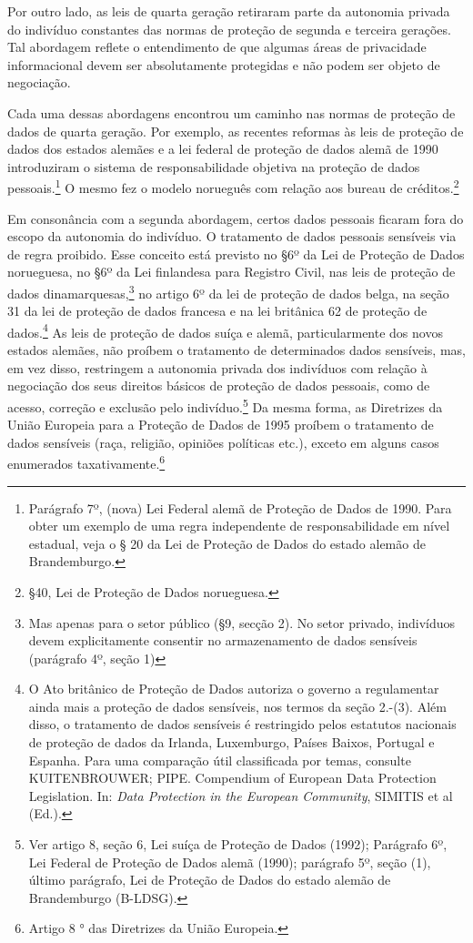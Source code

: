 Por outro lado, as leis de quarta geração retiraram parte da autonomia
privada do indivíduo constantes das normas de proteção de segunda e
terceira gerações. Tal abordagem reflete o entendimento de que algumas
áreas de privacidade informacional devem ser absolutamente protegidas e
não podem ser objeto de negociação.

Cada uma dessas abordagens encontrou um caminho nas normas de proteção
de dados de quarta geração. Por exemplo, as recentes reformas às leis de
proteção de dados dos estados alemães e a lei federal de proteção de
dados alemã de 1990 introduziram o sistema de responsabilidade objetiva
na proteção de dados pessoais.\footnote{Parágrafo 7º, (nova) Lei Federal
  alemã de Proteção de Dados de 1990. Para obter um exemplo de uma regra
  independente de responsabilidade em nível estadual, veja o § 20 da Lei
  de Proteção de Dados do estado alemão de Brandemburgo.} O mesmo fez o
modelo norueguês com relação aos bureau de créditos.\footnote{§40, Lei
  de Proteção de Dados norueguesa.}

Em consonância com a segunda abordagem, certos dados pessoais ficaram
fora do escopo da autonomia do indivíduo. O tratamento de dados pessoais
sensíveis via de regra proibido. Esse conceito está previsto no §6º da
Lei de Proteção de Dados norueguesa, no §6º da Lei finlandesa para
Registro Civil, nas leis de proteção de dados dinamarquesas,\footnote{Mas
  apenas para o setor público (§9, secção 2). No setor privado,
  indivíduos devem explicitamente consentir no armazenamento de dados
  sensíveis (parágrafo 4º, seção 1)} no artigo 6º da lei de proteção de
dados belga, na seção 31 da lei de proteção de dados francesa e na lei
britânica 62 de proteção de dados.\footnote{O Ato britânico de Proteção
  de Dados autoriza o governo a regulamentar ainda mais a proteção de
  dados sensíveis, nos termos da seção 2.-(3). Além disso, o tratamento
  de dados sensíveis é restringido pelos estatutos nacionais de proteção
  de dados da Irlanda, Luxemburgo, Países Baixos, Portugal e Espanha.
  Para uma comparação útil classificada por temas, consulte
  KUITENBROUWER; PIPE. Compendium of European Data Protection
  Legislation. In: \emph{Data Protection in the European Community},
  SIMITIS et al (Ed.).} As leis de proteção de dados suíça e alemã,
particularmente dos novos estados alemães, não proíbem o tratamento de
determinados dados sensíveis, mas, em vez disso, restringem a autonomia
privada dos indivíduos com relação à negociação dos seus direitos
básicos de proteção de dados pessoais, como de acesso, correção e
exclusão pelo indivíduo.\footnote{Ver artigo 8, seção 6, Lei suíça de
  Proteção de Dados (1992); Parágrafo 6º, Lei Federal de Proteção de
  Dados alemã (1990); parágrafo 5º, seção (1), último parágrafo, Lei de
  Proteção de Dados do estado alemão de Brandemburgo (B-LDSG).} Da mesma
forma, as Diretrizes da União Europeia para a Proteção de Dados de 1995
proíbem o tratamento de dados sensíveis (raça, religião, opiniões
políticas etc.), exceto em alguns casos enumerados
taxativamente.\footnote{Artigo 8 ° das Diretrizes da União Europeia.}

